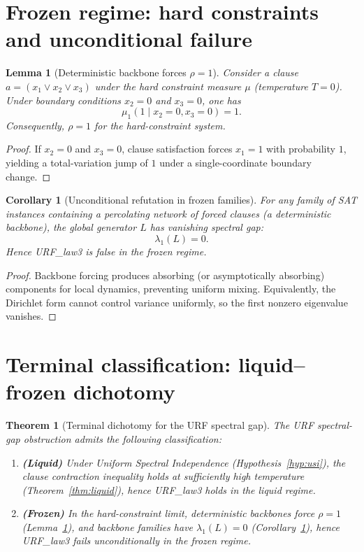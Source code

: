 \documentclass[11pt]{article}
\newtheorem{theorem}{Theorem}
\newtheorem{lemma}{Lemma}
\newtheorem{corollary}{Corollary}
\begin{document}
\section{Frozen regime: hard constraints and unconditional failure}

\begin{lemma}[Deterministic backbone forces $\rho=1$]\label{lem:backbone}
Consider a clause $a=(x_1\vee x_2\vee x_3)$ under the hard constraint measure $\mu$ (temperature $T=0$).
Under boundary conditions $x_2=0$ and $x_3=0$, one has
\[
\mu_1(1\mid x_2=0,x_3=0)=1.
\]
Consequently, $\rho=1$ for the hard-constraint system.
\end{lemma}

\begin{proof}
If $x_2=0$ and $x_3=0$, clause satisfaction forces $x_1=1$ with probability $1$, yielding a total-variation jump of $1$
under a single-coordinate boundary change.
\end{proof}

\begin{corollary}[Unconditional refutation in frozen families]\label{cor:frozen}
For any family of SAT instances containing a percolating network of forced clauses (a deterministic backbone),
the global generator $L$ has vanishing spectral gap:
\[
\lambda_1(L)=0.
\]
Hence URF\_law3 is false in the frozen regime.
\end{corollary}

\begin{proof}
Backbone forcing produces absorbing (or asymptotically absorbing) components for local dynamics, preventing uniform mixing.
Equivalently, the Dirichlet form cannot control variance uniformly, so the first nonzero eigenvalue vanishes.
\end{proof}

\section{Terminal classification: liquid--frozen dichotomy}

\begin{theorem}[Terminal dichotomy for the URF spectral gap]\label{thm:dichotomy}
The URF spectral-gap obstruction admits the following classification:
\begin{enumerate}
\item \textbf{(Liquid)} Under Uniform Spectral Independence (Hypothesis~\ref{hyp:usi}), the clause contraction inequality holds
at sufficiently high temperature (Theorem~\ref{thm:liquid}), hence URF\_law3 holds in the liquid regime.
\item \textbf{(Frozen)} In the hard-constraint limit, deterministic backbones force $\rho=1$ (Lemma~\ref{lem:backbone}),
and backbone families have $\lambda_1(L)=0$ (Corollary~\ref{cor:frozen}), hence URF\_law3 fails unconditionally in the frozen regime.
\end{enumerate}
\end{theorem}
\end{document}
